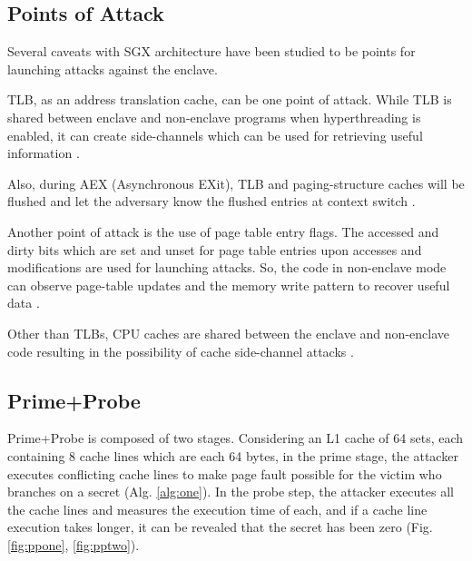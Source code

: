 \subsection{Points of Attack}
Several caveats with SGX architecture have been studied to be points for launching attacks against the enclave.

TLB, as an address translation cache, can be one point of attack. While TLB is shared between enclave and non-enclave programs when hyperthreading is enabled, it can create side-channels which can be used for retrieving useful information \cite{leakycauldron}.

Also, during AEX (Asynchronous EXit), TLB and paging-structure caches will be flushed and let the adversary know the flushed entries at context switch \cite{leakycauldron}.

Another point of attack is the use of page table entry flags. The accessed and dirty bits which are set and unset for page table entries upon accesses and modifications are used for launching attacks. So, the code in non-enclave mode can observe page-table updates and the memory write pattern to recover useful data \cite{leakycauldron,stealthy}.

Other than TLBs, CPU caches are shared between the enclave and non-enclave code resulting in the possibility of cache side-channel attacks \cite{leakycauldron}.

\subsection{Prime+Probe}
Prime+Probe is composed of two stages. Considering an L1 cache of 64 sets, each containing 8 cache lines which are each 64 bytes, in the prime stage, the attacker executes conflicting cache lines to make page fault possible for the victim who branches on a secret (Alg. \ref{alg:one}). In the probe step, the attacker executes all the cache lines and measures the execution time of each, and if a cache line execution takes longer, it can be revealed that the secret has been zero \cite{primeprobe1,primeprobe2,cloak} (Fig. \ref{fig:ppone}, \ref{fig:pptwo}).

